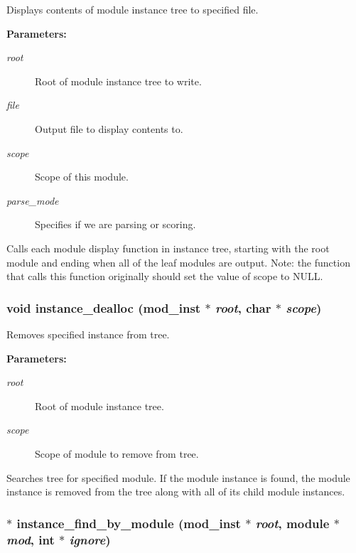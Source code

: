 Displays contents of module instance tree to specified file.

\begin{Desc}
\item[{\bf Parameters: }]\par
\begin{description}
\item[
{\em root}]Root of module instance tree to write. \item[
{\em file}]Output file to display contents to. \item[
{\em scope}]Scope of this module. \item[
{\em parse\_\-mode}]Specifies if we are parsing or scoring.

\end{description}
\end{Desc}
Calls each module display function in instance tree, starting with the root module and ending when all of the leaf modules are output. Note: the function that calls this function originally should set the value of scope to NULL. 
\subsubsection{\setlength{\rightskip}{0pt plus 5cm}void instance\_\-dealloc ({\bf mod\_\-inst} $\ast$ {\em root}, char $\ast$ {\em scope})}\label{instance_8h_a6}


Removes specified instance from tree.

\begin{Desc}
\item[{\bf Parameters: }]\par
\begin{description}
\item[
{\em root}]Root of module instance tree. \item[
{\em scope}]Scope of module to remove from tree.

\end{description}
\end{Desc}
Searches tree for specified module. If the module instance is found, the module instance is removed from the tree along with all of its child module instances. 
\subsubsection{$\ast$ instance\_\-find\_\-by\_\-module ({\bf mod\_\-inst} $\ast$ {\em root}, {\bf module} $\ast$ {\em mod}, int $\ast$ {\em ignore})}\label{instance_8h_a2}


